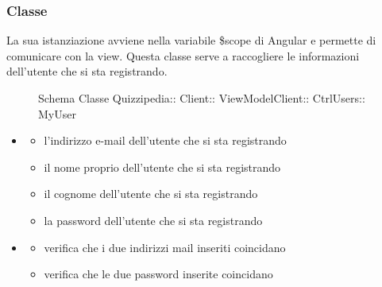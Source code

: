 \subsubsection{Classe }
La sua istanziazione avviene nella variabile \$scope di Angular e permette di comunicare con la view. Questa classe serve a raccogliere le informazioni dell'utente che si sta registrando.
\begin{figure}[H]
\centering
\noindent{}
\caption[Schema Classe MyUser]{Schema Classe Quizzipedia:: Client:: ViewModelClient:: CtrlUsers:: MyUser}
\end{figure}
\begin{itemize}
\item {}
\begin{itemize}
\item {}
\newline
l'indirizzo e-mail dell'utente che si sta registrando
\item {}
\newline
il nome proprio dell'utente che si sta registrando
\item {}
\newline
il cognome dell'utente che si sta registrando
\item {}
\newline
la password dell'utente che si sta registrando
\end{itemize}
\item {}
\begin{itemize}
\item {}
\newline
verifica che i due indirizzi mail inseriti coincidano
\newline
\item {}
\newline
verifica che le due password inserite coincidano
\newline
\end{itemize}
\end{itemize}

